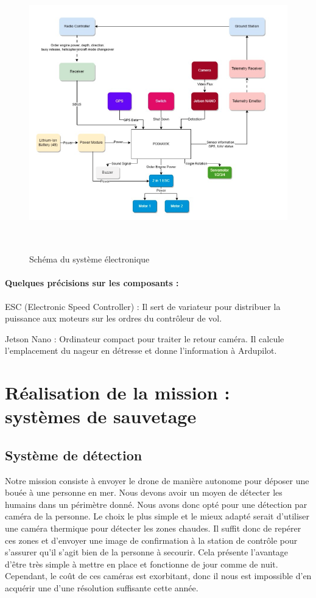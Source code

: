 \documentclass[a4paper,12pt,french]{report}
\begin{document}
\begin{figure}[h]
    \centering
    \includegraphics[height=12cm]{figures/elec.png}
    \caption{Schéma du système électronique}
\end{figure}

\subsubsection{Quelques précisions sur les composants :}

ESC (Electronic Speed Controller) : Il sert de variateur pour distribuer la puissance aux moteurs sur les ordres du contrôleur de vol.\newline

Jetson Nano : Ordinateur compact pour traiter le retour caméra. Il calcule l’emplacement du nageur en détresse et donne l’information à Ardupilot.

\chapter{Réalisation de la mission : systèmes de sauvetage}

\section{Système de détection}

Notre mission consiste à envoyer le drone de manière autonome pour déposer une bouée à une personne en mer. Nous devons avoir un moyen de détecter les humains dans un périmètre donné. Nous avons donc opté pour une détection par caméra de la personne. Le choix le plus simple et le mieux adapté serait d'utiliser une caméra thermique pour détecter les zones chaudes. Il suffit donc de repérer ces zones et d'envoyer une image de confirmation à la station de contrôle pour s'assurer qu'il s'agit bien de la personne à secourir. Cela présente l'avantage d'être très simple à mettre en place et fonctionne de jour comme de nuit. Cependant, le coût de ces caméras est exorbitant, donc il nous est impossible d'en acquérir une d'une résolution suffisante cette année.\newline
\end{document}
